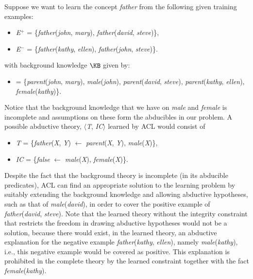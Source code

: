 \begin{example}
Suppose we want to learn the concept \textit{father} from the following given training examples:
\begin{itemize}
\item[] \textit{E}$^{+}$ = \{\textit{father}(\textit{john}, \textit{mary}), \textit{father}(\textit{david}, \textit{steve})\},
\item[] \textit{E}$^{-}$ = \{\textit{father}(\textit{kathy}, \textit{ellen}), \textit{father}(\textit{john}, \textit{steve})\}.
\end{itemize}
\noindent with background knowledge $\KB$ given by:
\begin{itemize}
\item[] \textit{\KB} = \{\textit{parent}(\textit{john}, \textit{mary}), \textit{male}(\textit{john}), \textit{parent}(\textit{david}, \textit{steve}), \textit{parent}(\textit{kathy}, \textit{ellen}), \textit{female}(\textit{kathy})\}.
\end{itemize}
\noindent Notice that the background knowledge that we have on \textit{male} and \textit{female} is incomplete and assumptions on these form the abducibles in our problem.
\noindent A possible abductive theory, $\langle$\textit{T}, \textit{IC}$\rangle$ learned by ACL would consist of
\begin{itemize}
\item[] \textit{T} = \{\textit{father}(\textit{X}, \textit{Y}) \quad  $\leftarrow$ \quad \textit{parent}(\textit{X}, \textit{Y}), \textit{male}(\textit{X})\},
\item[] \textit{IC} = \{\textit{false} \quad $\leftarrow$ \quad \textit{male}(\textit{X}), \textit{female}(\textit{X})\}.
\end{itemize}
Despite the fact that the background theory is incomplete (in its abducible predicates), ACL can find an appropriate solution to the learning problem by suitably extending the background knowledge and allowing abductive hypotheses, such as that of \textit{male}(\textit{david}), in order to cover the positive example of \textit{father}(\textit{david}, \textit{steve}). Note that the learned theory without the integrity constraint that restricts the freedom in drawing abductive hypotheses would not be a solution, because there would exist, in the learned theory, an abductive explanation for the negative example \textit{father}(\textit{kathy}, \textit{ellen}), namely \textit{male}(\textit{kathy}), i.e., this negative example would be covered as positive. This explanation is prohibited in the complete theory by the learned constraint together with the fact \textit{female}(\textit{kathy}). 
\end{example}
